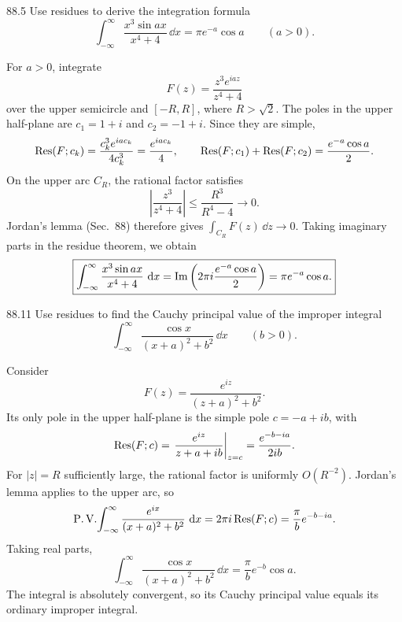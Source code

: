 \documentclass[11pt,oneside]{article}
\begin{document}
\begin{exercise}{88.5}
Use residues to derive the integration formula
\[
    \int_{-\infty}^{\infty}\frac{x^3\sin ax}{x^4+4}\,\dd x
    =\pi e^{-a}\cos a\qquad(a>0).
\]
\end{exercise}

\begin{solution}
For $a>0$, integrate
\[
    F(z)=\frac{z^3e^{iaz}}{z^4+4}
\]
over the upper semicircle and $[-R,R]$, where $R>\sqrt2$. The poles in the upper half-plane are $c_1=1+i$ and $c_2=-1+i$. Since they are simple,
\[
    \operatorname{Res}(F;c_k)=\frac{c_k^3e^{iac_k}}{4c_k^3}
      =\frac{e^{iac_k}}4,
    \qquad
    \operatorname{Res}(F;c_1)+\operatorname{Res}(F;c_2)=\frac{e^{-a}\cos a}{2}.
\]
On the upper arc $C_R$, the rational factor satisfies
\[
    \left|\frac{z^3}{z^4+4}\right|
    \le\frac{R^3}{R^4-4}\longrightarrow0.
\]
Jordan's lemma (Sec.~88) therefore gives $\int_{C_R}F(z)\,\dd z\to0$. Taking imaginary parts in the residue theorem, we obtain
\[
    \boxed{\int_{-\infty}^{\infty}\frac{x^3\sin ax}{x^4+4}\,\mathop{}\!\mathrm{d} x
      =\operatorname{Im}\left(2\pi i\frac{e^{-a}\cos a}{2}\right)
      =\pi e^{-a}\cos a.}
\]
\end{solution}

\begin{exercise}{88.11}
Use residues to find the Cauchy principal value of the improper integral
\[
    \int_{-\infty}^{\infty}\frac{\cos x}{(x+a)^2+b^2}\,\dd x
    \qquad(b>0).
\]
\end{exercise}

\begin{solution}
Consider
\[
    F(z)=\frac{e^{iz}}{(z+a)^2+b^2}.
\]
Its only pole in the upper half-plane is the simple pole $c=-a+ib$, with
\[
    \operatorname{Res}(F;c)=\left.\frac{e^{iz}}{z+a+ib}\right|_{z=c}
       =\frac{e^{-b-ia}}{2ib}.
\]
For $|z|=R$ sufficiently large, the rational factor is uniformly $O(R^{-2})$. Jordan's lemma applies to the upper arc, so
\[
    \operatorname{P.V.}\!\int_{-\infty}^{\infty}
       \frac{e^{ix}}{(x+a)^2+b^2}\,\mathop{}\!\mathrm{d} x
       =2\pi i\operatorname{Res}(F;c)=\frac\pi b e^{-b-ia}.
\]
Taking real parts,
\[
    \boxed{\int_{-\infty}^{\infty}\frac{\cos x}{(x+a)^2+b^2}\,\dd x
      =\frac\pi b e^{-b}\cos a.}
\]
The integral is absolutely convergent, so its Cauchy principal value equals its ordinary improper integral.
\end{solution}
\end{document}
